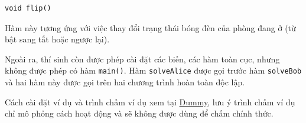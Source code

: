 \begin{center}
\begin{lstlisting}
void flip()
\end{lstlisting}
\end{center}

Hàm này tương ứng với việc thay đổi trạng thái bóng đèn của phòng đang ở (từ bật sang tắt hoặc ngược lại).

Ngoài ra, thí sinh còn được phép cài đặt các biến, các hàm toàn cục, nhưng không được phép có hàm \texttt{main()}. Hàm \texttt{solveAlice} được gọi trước hàm \texttt{solveBob} và hai hàm này được gọi trên hai chương trình hoàn toàn độc lập.

Cách cài đặt ví dụ và trình chấm ví dụ xem tại \href{https://codeforces.com/}{Dummy}, lưu ý trình chấm ví dụ chỉ mô phỏng cách hoạt động và sẽ không được dùng để chấm chính thức.
